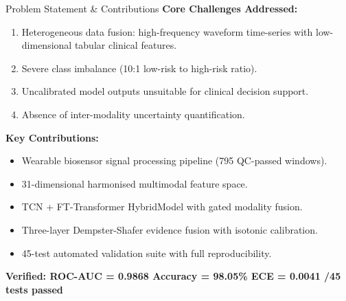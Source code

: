 \documentclass[aspectratio=169]{beamer}
\begin{document}
\begin{frame}{Problem Statement \& Contributions}
  \textbf{Core Challenges Addressed:}
  \begin{enumerate}
    \item Heterogeneous data fusion: high-frequency waveform time-series
          with low-dimensional tabular clinical features.
    \item Severe class imbalance (10:1 low-risk to high-risk ratio).
    \item Uncalibrated model outputs unsuitable for clinical decision support.
    \item Absence of inter-modality uncertainty quantification.
  \end{enumerate}
  \vspace{0.3em}
  \textbf{Key Contributions:}
  \begin{itemize}
    \item Wearable biosensor signal processing pipeline (795 QC-passed windows).
    \item 31-dimensional harmonised multimodal feature space.
    \item TCN + FT-Transformer HybridModel with gated modality fusion.
    \item Three-layer Dempster-Shafer evidence fusion with isotonic calibration.
    \item 45-test automated validation suite with full reproducibility.
  \end{itemize}
  \vspace{0.2em}
  {\color{teal!80!black}\textbf{Verified: ROC-AUC = 0.9868
  \quad Accuracy = 98.05\% \quad ECE = 0.0041 /45 tests passed}}
\end{frame}
\end{document}

